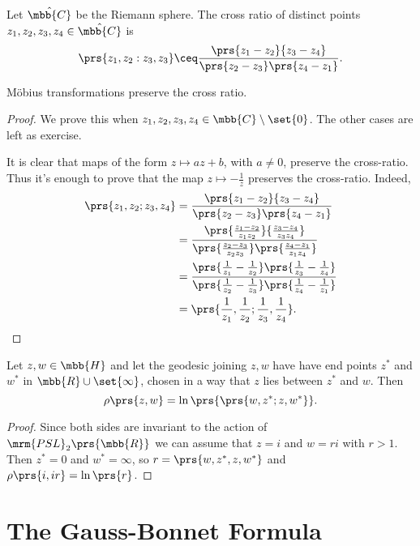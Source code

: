 \documentclass[10pt, twoside]{book}
\begin{document}
\begin{definition}
Let $\hat{\mbb{C}}$ be the Riemann sphere. The cross ratio of distinct points $z_1, z_2, z_3, z_4 \in \hat{\mbb{C}}$ is
\[\prs{z_1, z_2 : z_3, z_3} \ceq \frac{\prs{z_1 - z_2}{z_3 - z_4}}{\prs{z_2 - z_3}\prs{z_4 - z_1}} \text{.}\]
\end{definition}

\begin{lemma}
Möbius transformations preserve the cross ratio.
\end{lemma}

\begin{proof}
We prove this when $z_1, z_2, z_3, z_4 \in \mbb{C} \setminus \set{0}$. The other cases are left as exercise.

It is clear that maps of the form $z \mapsto az + b$, with $a \neq 0$, preserve the cross-ratio. Thus it's enough to prove that the map $z \mapsto -\frac{1}{z}$ preserves the cross-ratio.
Indeed,
\begin{align*}
\prs{z_1, z_2 ; z_3, z_4} &=
\frac{\prs{z_1 - z_2}{z_3 - z_4}}{\prs{z_2 - z_3}\prs{z_4 - z_1}}
\\&=
\frac{\prs{\frac{z_1 - z_2}{z_1 z_2}}{\frac{z_3 - z_4}{z_3 z_4}}}{\prs{\frac{z_2 - z_3}{z_2 z_3}}\prs{\frac{z_4 - z_1}{z_1 z_4}}}
\\&=
\frac{\prs{\frac{1}{z_1} - \frac{1}{z_2}}\prs{\frac{1}{z_3} - \frac{1}{z_4}}}{\prs{\frac{1}{z_2} - \frac{1}{z_3}}\prs{\frac{1}{z_4} - \frac{1}{z_1}}}
\\&=
\prs{\frac{1}{z_1}, \frac{1}{z_2} ; \frac{1}{z_3}, \frac{1}{z_4}} \text{.}
\end{align*}
\end{proof}

\begin{theorem}
Let $z,w \in \mbb{H}$ and let the geodesic joining $z,w$ have have end points $z^*$ and $w^*$ in $\mbb{R} \cup \set{\infty}$, chosen in a way that $z$ lies between $z^*$ and $w$. Then
\[\rho\prs{z,w} = \ln\prs{\prs{w, z^*; z, w^*}} \text{.}\]
\end{theorem}

\begin{proof}
Since both sides are invariant to the action of $\mrm{PSL}_2\prs{\mbb{R}}$ we can assume that $z = i$ and $w = ri$ with $r > 1$. Then $z^* = 0$ and $w^* = \infty$, so $r = \prs{w, z^*, z, w^*}$ and $\rho\prs{i,ir} = \ln\prs{r}$.
\end{proof}

\section{The Gauss-Bonnet Formula}
\end{document}

